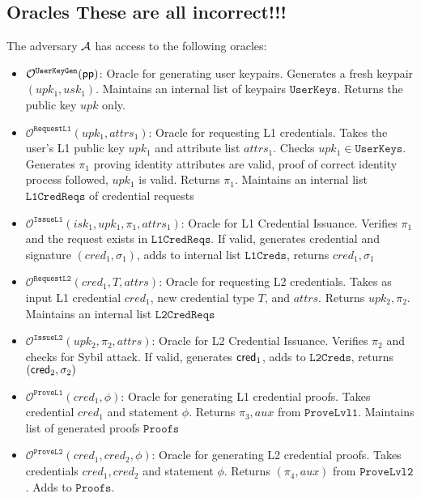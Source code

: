 \subsection{Oracles  These are all incorrect!!!}
The adversary $\mathcal{A}$ has access to the following oracles:




\begin{itemize}
    \item $\mathcal{O}^{\texttt{UserKeyGen}}(\mathsf{pp})$: Oracle for generating user keypairs. Generates a fresh keypair $(upk_1, usk_1)$. Maintains an internal list of keypairs $\texttt{UserKeys}$. Returns the public key $upk$ only.
    
    \item $\mathcal{O}^{\texttt{RequestL1}}(upk_1, attrs_1)$: Oracle for requesting L1 credentials. Takes the user's L1 public key $upk_1$ and attribute list $attrs_1$. Checks $upk_1 \in \texttt{UserKeys}$. Generates $\pi_1$ proving identity attributes are valid, proof of correct identity process followed, $upk_1$ is valid. Returns $\pi_1$. Maintains an internal list $\texttt{L1CredReqs}$ of credential requests

    \item $\mathcal{O}^{\texttt{IssueL1}}(isk_1, upk_1, \pi_1, attrs_1)$: Oracle for L1 Credential Issuance. Verifies $\pi_1$ and the request exists in $\texttt{L1CredReqs}$. If valid, generates credential and signature $(cred_1, \sigma_1)$, adds to internal list $\texttt{L1Creds}$, returns $cred_1, \sigma_1$

    \item $\mathcal{O}^{\texttt{RequestL2}}(cred_1, T, attrs)$: Oracle for requesting L2 credentials. Takes as input L1 credential $cred_1$, new credential type $T$, and $attrs$. Returns $upk_2, \pi_2$. Maintains an internal list $\texttt{L2CredReqs}$

    \item $\mathcal{O}^{\texttt{IssueL2}}(upk_2, \pi_2, attrs)$: Oracle for L2 Credential Issuance. Verifies $\pi_2$ and checks for Sybil attack. If valid, generates $\mathsf{cred}_1$, adds to $\texttt{L2Creds}$, returns $(\mathsf{cred}_2, \sigma_2)$

    \item $\mathcal{O}^{\texttt{ProveL1}}(cred_1, \phi)$: Oracle for generating L1 credential proofs. Takes credential $cred_1$ and statement $\phi$. Returns $\pi_3, aux$ from $\texttt{ProveLvl1}$. Maintains list of generated proofs $\texttt{Proofs}$
    
    \item $\mathcal{O}^{\texttt{ProveL2}}(cred_1, cred_2, \phi)$: Oracle for generating L2 credential proofs. Takes credentials $cred_1, cred_2$ and statement $\phi$. Returns $(\pi_4, aux)$ from $\texttt{ProveLvl2}$. Adds to $\texttt{Proofs}$.


\end{itemize}
